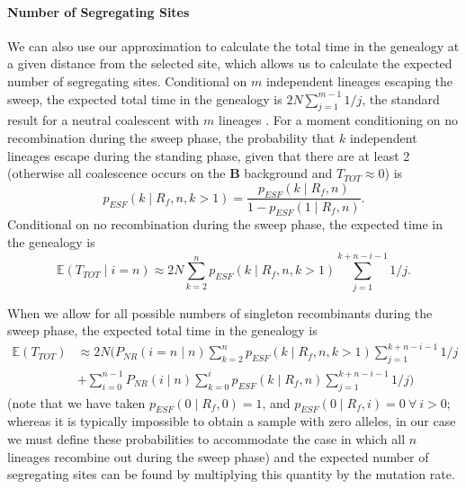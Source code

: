 \documentclass[a4paper,10pt]{article}
\begin{document}
\paragraph{Number of Segregating Sites}
We can also use our approximation to calculate the total time in the genealogy at a given distance from the selected site, which allows us to calculate the expected number of segregating sites. Conditional on $m$ independent lineages escaping the sweep, the expected total time in the genealogy is $2N \sum_{j=1}^{m-1} 1/j$, the standard result for a neutral coalescent with $m$ lineages \citep{Watterson:1975ur}. For a moment conditioning on no recombination during the sweep phase, the probability that $k$ independent lineages escape during the standing phase, given that there are at least 2 (otherwise all coalescence occurs on the $\textbf{B}$ background and $T_{TOT} \approx 0$) is 
\begin{equation}
	p_{ESF}\left(k \mid R_f , n , k > 1\right) = \frac{p_{ESF}\left(k \mid R_f , n \right)}{1 - p_{ESF}\left(1 \mid R_f , n \right)}.
\end{equation}
Conditional on no recombination during the sweep phase, the expected time in the genealogy is
\begin{equation}
	\mathbb{E}\left(T_{TOT} \mid i = n \right)  \approx 2N \sum_{k=2}^n p_{ESF}(k\mid R_f,n, k>1)   \sum_{j=1}^{k+n-i-1} 1/j.
\end{equation}

When we allow for all possible numbers of singleton recombinants during the sweep phase, the expected total time in the genealogy is
\begin{equation}
	\begin{aligned}
		\mathbb{E}(T_{TOT})  	&\approx 2N \biggl( P_{NR}(i=n\mid  n)  \sum_{k=2}^n p_{ESF}(k\mid R_f,n , k > 1)   \sum_{j=1}^{k+n-i-1} 1/j \\
							&+ \sum_{i=0}^{n-1} P_{NR} ( i \mid n) \sum_{k=0}^i p_{ESF}(k\mid R_f,n)   \sum_{j=1}^{k+n-i-1} 1/j\biggr)
	\end{aligned}
\end{equation}
(note that we have taken $p_{ESF}\left(0 \mid R_f,0\right)=1$, and $p_{ESF}\left(0 \mid R_f,i\right)=0\ \forall\ i > 0$; whereas it is typically impossible to obtain a sample with zero alleles, in our case we must define these probabilities to accommodate the case in which all $n$ lineages recombine out during the sweep phase)
and the expected number of segregating sites can be found by multiplying this quantity by the mutation rate. 
\end{document}

